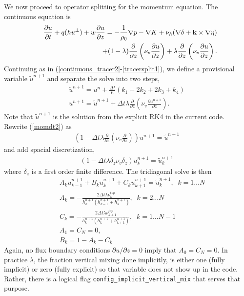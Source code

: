 \documentclass[11pt]{report}
\begin{document}
We now proceed to operator splitting for the momentum equation.  The continuous equation is
\begin{eqnarray}   
\nonumber &&
\frac{\partial u}{\partial t} + q (h u^{\perp}) 
 + w\frac{\partial u}{\partial z} 
  = - \frac{1}{\rho_0}\nabla p  - \nabla K
   +\nu_h(\nabla \delta + {\bf k}\times \nabla \eta)
\\ &&
\hspace{1cm}
\label{continuous_momentum1} 
 + (1-\lambda)\frac{\partial }{\partial z} 
\left( \nu_v \frac{\partial u}{\partial z} \right)
 + \lambda\frac{\partial }{\partial z} 
\left( \nu_v \frac{\partial u}{\partial z} \right) .
\end{eqnarray}
Continuing as in (\ref{continuous_tracer2}-\ref{tracersplit1}), we define a provisional 
variable $\tilde{u}^{n+1}$ and separate the solve into two steps,
\begin{eqnarray}
\label{momdt1}
\tilde{u}^{n+1} = u^n 
+ \frac{\Delta t }{6}(k_1 + 2k_2 + 2k_3 + k_4)\\
\label{momdt2}
u^{n+1} = \tilde{u}^{n+1}
+ \Delta t \lambda \displaystyle\frac{\partial }{\partial z}
  \left( \nu_v \frac{\partial u^{n+1}}{\partial z} \right).
\end{eqnarray}
Note that $\tilde{u}^{n+1}$ is the solution from the explicit RK4 in the current code.  Rewrite (\ref{momdt2}) as
\begin{eqnarray}
\label{momdt3}
\left(1- \Delta t \lambda \displaystyle\frac{\partial }{\partial z}
  \left( \nu_v \frac{\partial}{\partial z} \right)
  \right)u^{n+1} = \tilde{u}^{n+1}
\end{eqnarray}
and add spacial discretization,
\begin{eqnarray}
\label{momdt4}
\left(1- \Delta t \lambda \delta_z \nu_v \delta_z \right)u^{n+1}_k
= \tilde{u}^{n+1}_k
\end{eqnarray}
where $\delta_z$ is a first order finite difference.  The tridiagonal solve is then
\begin{eqnarray}
\label{momtridiag}
&& A_{k} u^{n+1}_{k-1} + B_k u^{n+1}_k +  C_k u^{n+1}_{k+1} 
= \tilde{u}^{n+1}_k, \;\; k=1\ldots N\\
&& A_k = -\frac{2 \Delta t \lambda \nu^{top}_{k}}{h_k^{n+1}(h_{k-1}^{n+1} + h_{k}^{n+1})}, \;\; k=2\ldots N \\
&& C_k = -\frac{2 \Delta t \lambda \nu^{top}_{k+1}}{h_k^{n+1}(h_k^{n+1} + h_{k+1}^{n+1})}, \;\; k=1\ldots N-1 \\
&& A_1=C_N=0, \\
&& B_k = 1 - A_k - C_{k}
\end{eqnarray}
Again, no flux boundary conditions $\partial u/\partial z=0$ imply that $A_0=C_N=0$.  In practice $\lambda$, the fraction vertical mixing done implicitly, is either one (fully implicit) or zero (fully explicit) so that variable does not show up in the code.  Rather, there is a logical flag \verb=config_implicit_vertical_mix= that serves that purpose.
\end{document}
